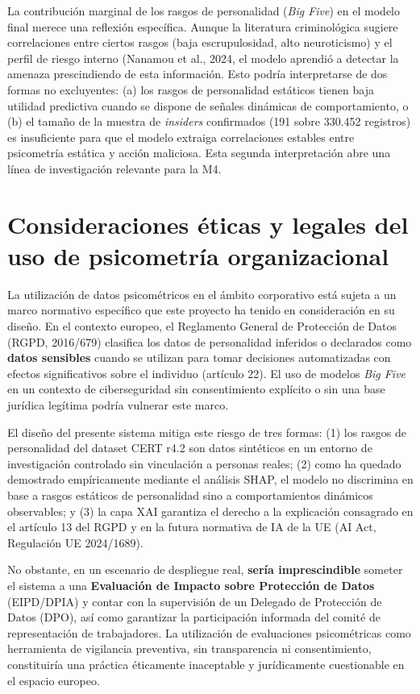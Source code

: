 \documentclass[IB]{TFUOC}%
\begin{document}
La contribución marginal de los rasgos de personalidad (\textit{Big Five}) en el modelo final merece una reflexión específica. Aunque la literatura criminológica sugiere correlaciones entre ciertos rasgos (baja escrupulosidad, alto neuroticismo) y el perfil de riesgo interno (Nanamou et al., 2024, el modelo aprendió a detectar la amenaza prescindiendo de esta información. Esto podría interpretarse de dos formas no excluyentes: (a) los rasgos de personalidad estáticos tienen baja utilidad predictiva cuando se dispone de señales dinámicas de comportamiento, o (b) el tamaño de la muestra de \textit{insiders} confirmados (191 sobre 330.452 registros) es insuficiente para que el modelo extraiga correlaciones estables entre psicometría estática y acción maliciosa. Esta segunda interpretación abre una línea de investigación relevante para la M4.

\section{Consideraciones éticas y legales del uso de psicometría organizacional}

La utilización de datos psicométricos en el ámbito corporativo está sujeta a un marco normativo específico que este proyecto ha tenido en consideración en su diseño. En el contexto europeo, el Reglamento General de Protección de Datos (RGPD, 2016/679) clasifica los datos de personalidad inferidos o declarados como \textbf{datos sensibles} cuando se utilizan para tomar decisiones automatizadas con efectos significativos sobre el individuo (artículo 22). El uso de modelos \textit{Big Five} en un contexto de ciberseguridad sin consentimiento explícito o sin una base jurídica legítima podría vulnerar este marco.

\medskip
\noindent El diseño del presente sistema mitiga este riesgo de tres formas: (1) los rasgos de personalidad del dataset CERT r4.2 son datos sintéticos en un entorno de investigación controlado sin vinculación a personas reales; (2) como ha quedado demostrado empíricamente mediante el análisis SHAP, el modelo no discrimina en base a rasgos estáticos de personalidad sino a comportamientos dinámicos observables; y (3) la capa XAI garantiza el derecho a la explicación consagrado en el artículo 13 del RGPD y en la futura normativa de IA de la UE (AI Act, Regulación UE 2024/1689).

\medskip
\noindent No obstante, en un escenario de despliegue real, \textbf{sería imprescindible} someter el sistema a una \textbf{Evaluación de Impacto sobre Protección de Datos} (EIPD/DPIA) y contar con la supervisión de un Delegado de Protección de Datos (DPO), así como garantizar la participación informada del comité de representación de trabajadores. La utilización de evaluaciones psicométricas como herramienta de vigilancia preventiva, sin transparencia ni consentimiento, constituiría una práctica éticamente inaceptable y jurídicamente cuestionable en el espacio europeo.
\end{document}
